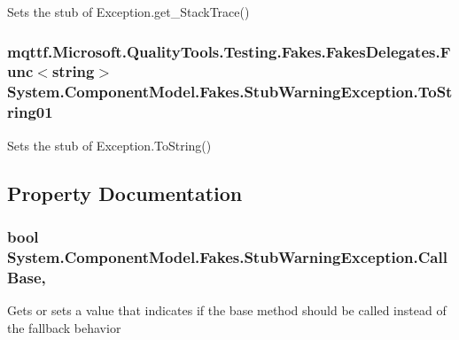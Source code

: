 Sets the stub of Exception.\-get\-\_\-\-Stack\-Trace()

\hypertarget{class_system_1_1_component_model_1_1_fakes_1_1_stub_warning_exception_a8625667f139aec40de3840af9c131f21}{
\subsubsection[{To\-String01}]{\setlength{\rightskip}{0pt plus 5cm}mqttf.\-Microsoft.\-Quality\-Tools.\-Testing.\-Fakes.\-Fakes\-Delegates.\-Func$<$string$>$ System.\-Component\-Model.\-Fakes.\-Stub\-Warning\-Exception.\-To\-String01}}\label{class_system_1_1_component_model_1_1_fakes_1_1_stub_warning_exception_a8625667f139aec40de3840af9c131f21}


Sets the stub of Exception.\-To\-String()



\subsection{Property Documentation}
\hypertarget{class_system_1_1_component_model_1_1_fakes_1_1_stub_warning_exception_ac1a0e2ccae2269774c5d2b431df78c4b}{
\subsubsection[{Call\-Base}]{\setlength{\rightskip}{0pt plus 5cm}bool System.\-Component\-Model.\-Fakes.\-Stub\-Warning\-Exception.\-Call\-Base\hspace{0.3cm}{\ttfamily [get]}, {\ttfamily [set]}}}\label{class_system_1_1_component_model_1_1_fakes_1_1_stub_warning_exception_ac1a0e2ccae2269774c5d2b431df78c4b}


Gets or sets a value that indicates if the base method should be called instead of the fallback behavior

